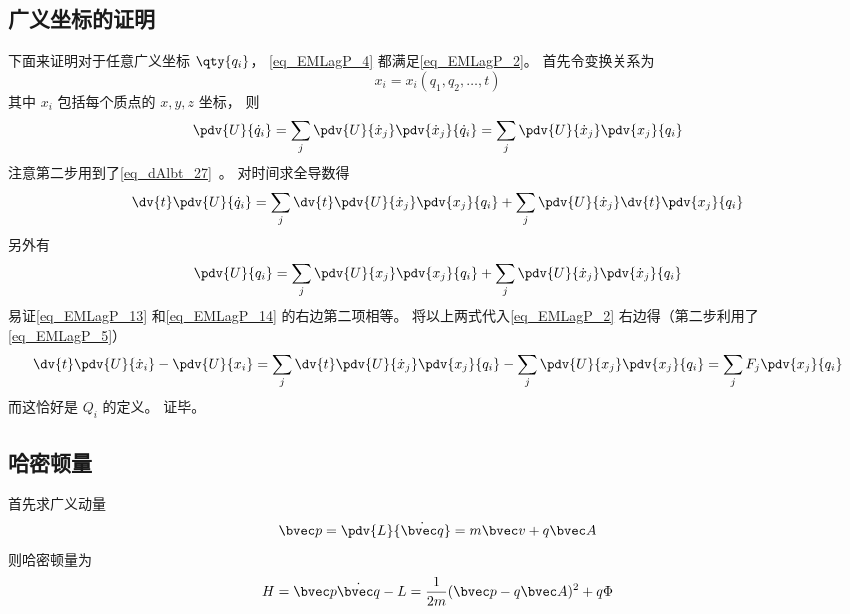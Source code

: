 \subsection{广义坐标的证明}
下面来证明对于任意广义坐标 $\qty{q_i}$， \autoref{eq_EMLagP_4} 都满足\autoref{eq_EMLagP_2}。 首先令变换关系为
\begin{equation}
x_i = x_i(q_1, q_2, \dots, t)
\end{equation}
其中 $x_i$ 包括每个质点的 $x, y, z$ 坐标， 则
\begin{equation}
\pdv{U}{\dot q_i} = \sum_j \pdv{U}{\dot x_j} \pdv{\dot x_j}{\dot q_i} = \sum_j \pdv{U}{\dot x_j} \pdv{x_j}{q_i}
\end{equation}
注意第二步用到了\autoref{eq_dAlbt_27}~。 对时间求全导数得
\begin{equation}\label{eq_EMLagP_13}
\dv{t} \pdv{U}{\dot q_i} = \sum_j \dv{t}\pdv{U}{\dot x_j} \pdv{x_j}{q_i} + \sum_j \pdv{U}{\dot x_j} \dv{t} \pdv{x_j}{q_i}
\end{equation}
另外有
\begin{equation}\label{eq_EMLagP_14}
\pdv{U}{q_i} = \sum_j \pdv{U}{x_j} \pdv{x_j}{q_i} + \sum_j \pdv{U}{\dot x_j} \pdv{\dot x_j}{q_i}
\end{equation}
易证\autoref{eq_EMLagP_13} 和\autoref{eq_EMLagP_14} 的右边第二项相等。 将以上两式代入\autoref{eq_EMLagP_2} 右边得（第二步利用了\autoref{eq_EMLagP_5}）
\begin{equation}
\dv{t} \pdv{U}{\dot x_i} - \pdv{U}{x_i} =  \sum_j \dv{t}\pdv{U}{\dot x_j} \pdv{x_j}{q_i} - \sum_j \pdv{U}{x_j} \pdv{x_j}{q_i} = \sum_j F_j \pdv{x_j}{q_i}
\end{equation}
而这恰好是 $Q_i$ 的定义。%
证毕。

\subsection{哈密顿量}

首先求广义动量
\begin{equation}\label{eq_EMLagP_1}
\bvec p = \pdv{L}{\dot{\bvec q}} = m\bvec v + q\bvec A
\end{equation}
则哈密顿量为
\begin{equation}
H = \bvec p \dot{\bvec q} - L = \frac{1}{2m}(\bvec p - q\bvec A)^2 + q\Phi
\end{equation}
